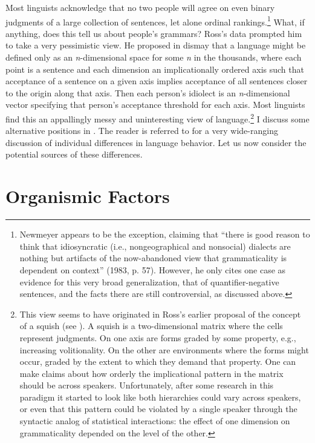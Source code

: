 Most linguists acknowledge that no two people will agree on even binary judgments of a large collection of sentences, let alone ordinal rankings.\footnote{Newmeyer appears to be the exception, claiming that ``there is good reason to think that idiosyncratic (i.e., nongeographical and nonsocial) dialects are nothing but artifacts of the now-abandoned view that grammaticality is dependent on context'' (1983, p. 57). However, he only cites one case as evidence for this very broad generalization, that of quantifier-negative sentences, and the facts there are still controversial, as discussed above.}
 What, if anything, does this tell us about people's grammars? Ross's data prompted him to take a very pessimistic view. He proposed in dismay that a language might be defined only as an \textit{n}-dimensional space for some \textit{n} in the thousands, where each point is a sentence and each dimension an implicationally ordered axis such that acceptance of a sentence on a given axis implies acceptance of all sentences closer to the origin along that axis. Then each person's idiolect is an \textit{n}-dimensional vector specifying that person's acceptance threshold for each axis. Most linguists find this an appallingly messy and uninteresting view of language.\footnote{This view seems to have originated in Ross's earlier proposal of the concept of a squish (see ). A squish is a two-dimensional matrix where the cells represent judgments. On one axis are forms graded by some property, e.g., increasing volitionality. On the other are environments where the forms might occur, graded by the extent to which they demand that property. One can make claims about how orderly the implicational pattern in the matrix should be across speakers. Unfortunately, after some research in this paradigm it started to look like both hierarchies could vary across speakers, or even that this pattern could be violated by a single speaker through the syntactic analog of statistical interactions: the effect of one dimension on grammaticality depended on the level of the other.
} 
I discuss some alternative positions in . The reader is referred to \citet{FillmoreEtAl1979a} for a very wide-ranging discussion of individual differences in language behavior. Let us now consider the potential sources of these differences.

\section{Organismic Factors}\label{sec:4.3}
